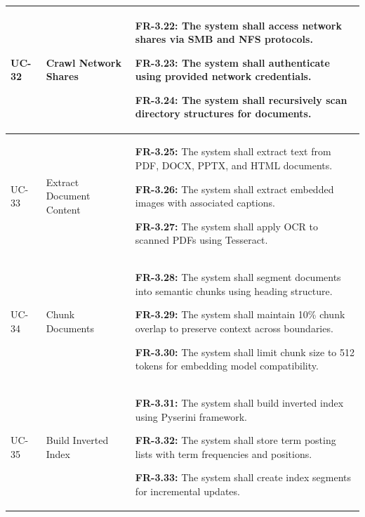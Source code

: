 \begin{longtable}{|>{\raggedright\arraybackslash}p{}|>{\raggedright\arraybackslash}p{}|>{\raggedright\arraybackslash}p{}|}
UC-32 & Crawl Network Shares &
\begin{frequirements}
\item \textbf{FR-3.22:} The system shall access network shares via SMB and NFS protocols.
\item \textbf{FR-3.23:} The system shall authenticate using provided network credentials.
\item \textbf{FR-3.24:} The system shall recursively scan directory structures for documents.
\end{frequirements} \\
\hline

UC-33 & Extract Document Content &
\begin{frequirements}
\item \textbf{FR-3.25:} The system shall extract text from PDF, DOCX, PPTX, and HTML documents.
\item \textbf{FR-3.26:} The system shall extract embedded images with associated captions.
\item \textbf{FR-3.27:} The system shall apply OCR to scanned PDFs using Tesseract.
\end{frequirements} \\
\hline

UC-34 & Chunk Documents &
\begin{frequirements}
\item \textbf{FR-3.28:} The system shall segment documents into semantic chunks using heading structure.
\item \textbf{FR-3.29:} The system shall maintain 10\% chunk overlap to preserve context across boundaries.
\item \textbf{FR-3.30:} The system shall limit chunk size to 512 tokens for embedding model compatibility.
\end{frequirements} \\
\hline

UC-35 & Build Inverted Index &
\begin{frequirements}
\item \textbf{FR-3.31:} The system shall build inverted index using Pyserini framework.
\item \textbf{FR-3.32:} The system shall store term posting lists with term frequencies and positions.
\item \textbf{FR-3.33:} The system shall create index segments for incremental updates.
\end{frequirements} \\
\hline


\end{longtable}
